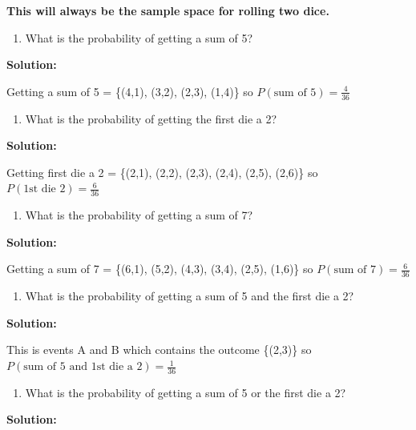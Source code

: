 \documentclass[
]{book}
\providecommand{\tightlist}{%
  \setlength{\itemsep}{0pt}\setlength{\parskip}{0pt}}
\begin{document}
\textbf{This will always be the sample space for rolling two dice.}

\begin{enumerate}
\def\labelenumi{\alph{enumi}.}
\setcounter{enumi}{1}
\tightlist
\item
  What is the probability of getting a sum of 5?
\end{enumerate}

\textbf{Solution:}

Getting a sum of 5 = \{(4,1), (3,2), (2,3), (1,4)\} so \(P(\text{sum of 5})=\frac{4}{36}\)

\begin{enumerate}
\def\labelenumi{\alph{enumi}.}
\setcounter{enumi}{2}
\tightlist
\item
  What is the probability of getting the first die a 2?
\end{enumerate}

\textbf{Solution:}

Getting first die a 2 = \{(2,1), (2,2), (2,3), (2,4), (2,5), (2,6)\} so \(P(\text{1st die 2})=\frac{6}{36}\)

\begin{enumerate}
\def\labelenumi{\alph{enumi}.}
\setcounter{enumi}{3}
\tightlist
\item
  What is the probability of getting a sum of 7?
\end{enumerate}

\textbf{Solution:}

Getting a sum of 7 = \{(6,1), (5,2), (4,3), (3,4), (2,5), (1,6)\} so \(P(\text{sum of 7})=\frac{6}{36}\)

\begin{enumerate}
\def\labelenumi{\alph{enumi}.}
\setcounter{enumi}{4}
\tightlist
\item
  What is the probability of getting a sum of 5 and the first die a 2?
\end{enumerate}

\textbf{Solution:}

This is events A and B which contains the outcome \{(2,3)\} so \(P(\text{sum of 5 and 1st die a 2})=\frac{1}{36}\)

\begin{enumerate}
\def\labelenumi{\alph{enumi}.}
\setcounter{enumi}{5}
\tightlist
\item
  What is the probability of getting a sum of 5 or the first die a 2?
\end{enumerate}

\textbf{Solution:}
\end{document}
